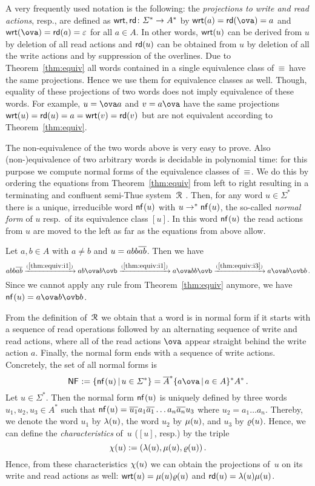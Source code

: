 A very frequently used notation is the following: the \emph{projections to write and read actions}, resp., are defined as $\mathsf{wrt},\mathsf{rd}\colon\varSigma^*\to A^*$ by $\wrt{a}=\rd{\ova}=a$ and $\wrt{\ova}=\rd{a}=\varepsilon$ for all $a\in A$. In other words, $\mathsf{wrt}(u)$ can be derived from $u$ by deletion of all read actions and $\mathsf{rd}(u)$ can be obtained from $u$ by deletion of all the write actions and by suppression of the overlines. Due to Theorem~\ref{thm:equiv} all words contained in a single equivalence class of~$\equiv_{}$ have the same projections. Hence we use them for equivalence classes as well. Though, equality of these projections of two words does not imply equivalence of these words. For example, $u=\ova a$ and $v=a\ova$ have the same projections $\mathsf{wrt}(u)=\mathsf{rd}(u)=a=\mathsf{wrt}(v)=\mathsf{rd}(v)$ but are not equivalent according to Theorem~\ref{thm:equiv}.

The non-equivalence of the two words above is very easy to prove. Also (non-)equivalence of two arbitrary words is decidable in polynomial time: for this purpose we compute normal forms of the equivalence classes of~$\equiv_{}$. We do this by ordering the equations from Theorem~\ref{thm:equiv} from left to right resulting in a terminating and confluent semi-Thue system~$\mathcal{R}_{}$ \cite[Lemma~4.1]{HusKZ17}. Then, for any word $u\in\varSigma^*$ there is a unique, irreducible word $\mathsf{nf}_{}(u)$ with $u\to^*\mathsf{nf}_{}(u)$, the so-called \emph{normal form} of $u$ resp.\ of its equivalence class $[u]$. In this word $\mathsf{nf}_{}(u)$ the read actions from $u$ are moved to the left as far as the equations from above allow.

\begin{example}\label{ex:nfx}
	Let $a,b\in A$ with $a\neq b$ and $u=abb\overline{ab}$. Then we have
	\[
	abb\ov{ab}\xrightarrow{(\ref{thm:equiv:i1})} ab\ova b\ovb\xrightarrow{(\ref{thm:equiv:i1})} a\ova bb\ovb\xrightarrow{(\ref{thm:equiv:i3})} a\ova b\ovb b\,.
	\]
	Since we cannot apply any rule from Theorem~\ref{thm:equiv} anymore, we have $\nfx{u}=a\ova b\ovb b$.
\end{example}

From the definition of~$\mathcal{R}_{}$ we obtain that a word is in normal form if it starts with a sequence of read operations followed by an alternating sequence of write and read actions, where all of the read actions $\ova$ appear straight behind the write action $a$. Finally, the normal form ends with a sequence of write actions. Concretely, the set of all normal forms is
\[\NFx:=\{\nfx{u}\,|\,u\in\varSigma^*\}=\ov{A}^*\{a\ova\,|\,a\in A\}^*A^*\,.\]
Let $u\in\varSigma^*$. Then the normal form $\mathsf{nf}_{}(u)$ is uniquely defined by three words $u_1,u_2,u_3\in A^*$ such that $\mathsf{nf}_{}(u)=\overline{u_1}a_1\overline{a_1}\dots a_n\overline{a_n}u_3$ where $u_2=a_1\dots a_n$. Thereby, we denote the word $u_1$ by $\lambda(u)$, the word $u_2$ by $\mu(u)$, and $u_3$ by $\varrho(u)$. Hence, we can define the \emph{characteristics} of~$u$ ($[u]$, resp.) by the triple 
\[\chi(u):=(\lambda(u),\mu(u),\varrho(u))\,.\]
Hence, from these characteristics $\chi(u)$ we can obtain the projections of~$u$ on its write and read actions as well: $\mathsf{wrt}(u)=\mu(u)\varrho(u)$ and $\mathsf{rd}(u)=\lambda(u)\mu(u)$.

